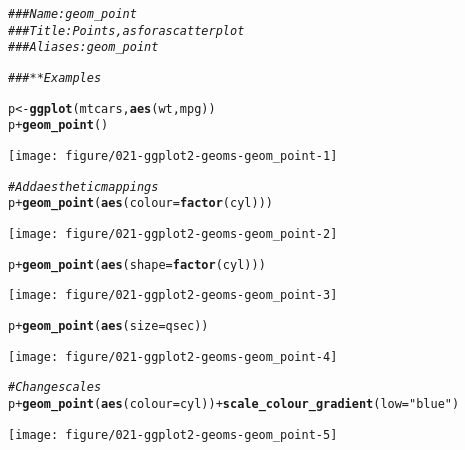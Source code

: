 \documentclass[a4paper,titlepage]{tufte-handout}\usepackage[]{graphicx}\usepackage[]{color}
\makeatletter
\def\maxwidth{ %
  \ifdim\Gin@nat@width>\linewidth
    \linewidth
  \else
    \Gin@nat@width
  \fi
}
\newcommand{\hlstr}[1]{\textcolor[rgb]{0.192,0.494,0.8}{#1}}%
\newcommand{\hlcom}[1]{\textcolor[rgb]{0.678,0.584,0.686}{\textit{#1}}}%
\newcommand{\hlopt}[1]{\textcolor[rgb]{0,0,0}{#1}}%
\newcommand{\hlstd}[1]{\textcolor[rgb]{0.345,0.345,0.345}{#1}}%
\newcommand{\hlkwb}[1]{\textcolor[rgb]{0.69,0.353,0.396}{#1}}%
\newcommand{\hlkwc}[1]{\textcolor[rgb]{0.333,0.667,0.333}{#1}}%
\newcommand{\hlkwd}[1]{\textcolor[rgb]{0.737,0.353,0.396}{\textbf{#1}}}%
\newenvironment{kframe}{%
 \def\at@end@of@kframe{}%
 \ifinner\ifhmode%
  \def\at@end@of@kframe{\end{minipage}}%
  \begin{minipage}{\columnwidth}%
 \fi\fi%
 \def\FrameCommand##1{\hskip\@totalleftmargin \hskip-\fboxsep
 \colorbox{shadecolor}{##1}\hskip-\fboxsep
     \hskip-\linewidth \hskip-\@totalleftmargin \hskip\columnwidth}%
 \MakeFramed {\advance\hsize-\width
   \@totalleftmargin\z@ \linewidth\hsize
   \@setminipage}}%
 {\par\unskip\endMakeFramed%
 \at@end@of@kframe}
\newenvironment{knitrout}{}{} %
\makeatother
\begin{document}
\begin{knitrout}
\color{fgcolor}\begin{kframe}
\begin{alltt}
\hlcom{### Name: geom_point}
\hlcom{### Title: Points, as for a scatterplot}
\hlcom{### Aliases: geom_point}

\hlcom{### ** Examples}

\hlstd{p} \hlkwb{<-} \hlkwd{ggplot}\hlstd{(mtcars,} \hlkwd{aes}\hlstd{(wt, mpg))}
\hlstd{p} \hlopt{+} \hlkwd{geom_point}\hlstd{()}
\end{alltt}
\end{kframe}
\texttt{[image: figure/021-ggplot2-geoms-geom\_point-1]} 
\begin{kframe}\begin{alltt}
\hlcom{# Add aesthetic mappings}
\hlstd{p} \hlopt{+} \hlkwd{geom_point}\hlstd{(}\hlkwd{aes}\hlstd{(}\hlkwc{colour} \hlstd{=} \hlkwd{factor}\hlstd{(cyl)))}
\end{alltt}
\end{kframe}
\texttt{[image: figure/021-ggplot2-geoms-geom\_point-2]} 
\begin{kframe}\begin{alltt}
\hlstd{p} \hlopt{+} \hlkwd{geom_point}\hlstd{(}\hlkwd{aes}\hlstd{(}\hlkwc{shape} \hlstd{=} \hlkwd{factor}\hlstd{(cyl)))}
\end{alltt}
\end{kframe}
\texttt{[image: figure/021-ggplot2-geoms-geom\_point-3]} 
\begin{kframe}\begin{alltt}
\hlstd{p} \hlopt{+} \hlkwd{geom_point}\hlstd{(}\hlkwd{aes}\hlstd{(}\hlkwc{size} \hlstd{= qsec))}
\end{alltt}
\end{kframe}
\texttt{[image: figure/021-ggplot2-geoms-geom\_point-4]} 
\begin{kframe}\begin{alltt}
\hlcom{# Change scales}
\hlstd{p} \hlopt{+} \hlkwd{geom_point}\hlstd{(}\hlkwd{aes}\hlstd{(}\hlkwc{colour} \hlstd{= cyl))} \hlopt{+} \hlkwd{scale_colour_gradient}\hlstd{(}\hlkwc{low} \hlstd{=} \hlstr{"blue"}\hlstd{)}
\end{alltt}
\end{kframe}
\texttt{[image: figure/021-ggplot2-geoms-geom\_point-5]} 
\begin{kframe}\begin{alltt}

\end{alltt}
\end{kframe}
\end{knitrout}
\end{document}
